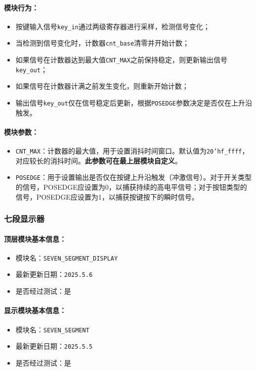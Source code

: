 \documentclass[lang=cn,a4paper,newtx]{elegantpaper}
\begin{document}
\paragraph{模块行为：}
\begin{itemize}
  \item 按键输入信号\texttt{key\_in}通过两级寄存器进行采样，检测信号变化；
  \item 当检测到信号变化时，计数器\texttt{cnt\_base}清零并开始计数；
  \item 如果信号在计数器达到最大值\texttt{CNT\_MAX}之前保持稳定，则更新输出信号\texttt{key\_out}；
  \item 如果信号在计数器计满之前发生变化，则重新开始计数；
  \item 输出信号\texttt{key\_out}仅在信号稳定后更新，根据\texttt{POSEDGE}参数决定是否仅在上升沿触发。
\end{itemize}

\paragraph{模块参数：}
\begin{itemize}
  \item \texttt{CNT\_MAX}：计数器的最大值，用于设置消抖时间窗口。默认值为\texttt{20'hf\_ffff}，对应较长的消抖时间。\textbf{此参数可在最上层模块自定义}。
  \item \texttt{POSEDGE}：用于设置输出是否仅在按键上升沿触发（冲激信号）。对于开关类型的信号，POSEDGE应设置为0，以捕获持续的高电平信号；对于按钮类型的信号，POSEDGE应设置为1，以捕获按键按下的瞬时信号。
\end{itemize}

\subsubsection{七段显示器}
\paragraph{顶层模块基本信息：}
\begin{itemize}
  \item 模块名：\texttt{SEVEN\_SEGMENT\_DISPLAY}
  \item 最新更新日期：\texttt{2025.5.6}
  \item 是否经过测试：是
\end{itemize}

\paragraph{显示模块基本信息：}
\begin{itemize}
  \item 模块名：\texttt{SEVEN\_SEGMENT}
  \item 最新更新日期：\texttt{2025.5.5}
  \item 是否经过测试：是
\end{itemize}
\end{document}
